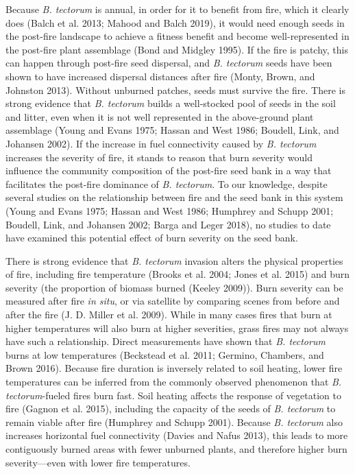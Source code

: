 \documentclass[
  12pt,
]{article}
\begin{document}
Because \emph{B. tectorum} is annual, in order for it to benefit from
fire, which it clearly does (Balch et al. 2013; Mahood and Balch 2019),
it would need enough seeds in the post-fire landscape to achieve a
fitness benefit and become well-represented in the post-fire plant
assemblage (Bond and Midgley 1995). If the fire is patchy, this can
happen through post-fire seed dispersal, and \emph{B. tectorum} seeds
have been shown to have increased dispersal distances after fire (Monty,
Brown, and Johnston 2013). Without unburned patches, seeds must survive
the fire. There is strong evidence that \emph{B. tectorum} builds a
well-stocked pool of seeds in the soil and litter, even when it is not
well represented in the above-ground plant assemblage (Young and Evans
1975; Hassan and West 1986; Boudell, Link, and Johansen 2002). If the
increase in fuel connectivity caused by \emph{B. tectorum} increases the
severity of fire, it stands to reason that burn severity would influence
the community composition of the post-fire seed bank in a way that
facilitates the post-fire dominance of \emph{B. tectorum}. To our
knowledge, despite several studies on the relationship between fire and
the seed bank in this system (Young and Evans 1975; Hassan and West
1986; Humphrey and Schupp 2001; Boudell, Link, and Johansen 2002; Barga
and Leger 2018), no studies to date have examined this potential effect
of burn severity on the seed bank.

There is strong evidence that \emph{B. tectorum} invasion alters the
physical properties of fire, including fire temperature (Brooks et al.
2004; Jones et al. 2015) and burn severity (the proportion of biomass
burned (Keeley 2009)). Burn severity can be measured after fire \emph{in
situ}, or via satellite by comparing scenes from before and after the
fire (J. D. Miller et al. 2009). While in many cases fires that burn at
higher temperatures will also burn at higher severities, grass fires may
not always have such a relationship. Direct measurements have shown that
\emph{B. tectorum} burns at low temperatures (Beckstead et al. 2011;
Germino, Chambers, and Brown 2016). Because fire duration is inversely
related to soil heating, lower fire temperatures can be inferred from
the commonly observed phenomenon that \emph{B. tectorum}-fueled fires
burn fast. Soil heating affects the response of vegetation to fire
(Gagnon et al. 2015), including the capacity of the seeds of \emph{B.
tectorum} to remain viable after fire (Humphrey and Schupp 2001).
Because \emph{B. tectorum} also increases horizontal fuel connectivity
(Davies and Nafus 2013), this leads to more contiguously burned areas
with fewer unburned plants, and therefore higher burn severity---even
with lower fire temperatures.
\end{document}
